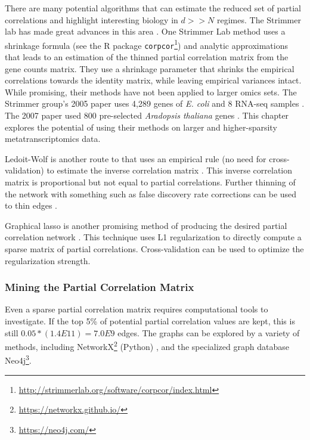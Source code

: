 There are many potential algorithms that can estimate the reduced set of partial correlations and highlight interesting biology in $d >> N$ regimes.
The Strimmer lab has made great advances in this area \cite{schafer2001, schafer2005, opgen2007shrinkage}.
One Strimmer Lab method uses a shrinkage formula (see the R package \texttt{corpcor}\footnote{\url{http://strimmerlab.org/software/corpcor/index.html}}) and analytic approximations that leads to an estimation of the thinned partial correlation matrix from the gene counts matrix.
They use a shrinkage parameter that shrinks the empirical correlations towards the identity matrix, while leaving empirical variances intact.
While promising, their methods have not been applied to larger omics sets.
The Strimmer group's 2005 paper uses 4,289 genes of \textit{E. coli} and 8 RNA-seq samples \cite{schafer2005}.
The 2007 paper used 800 pre-selected \textit{Aradopsis thaliana} genes \cite{opgen2007Aradopsis}.
This chapter explores the potential of using their methods on larger and higher-sparsity metatranscriptomics data.

Ledoit-Wolf is another route to that uses an empirical rule (no need for cross-validation) to estimate the inverse correlation matrix \cite{ledoit2003}.
This inverse correlation matrix is proportional but not equal to partial correlations.
Further thinning of the network with something such as false discovery rate corrections can be used to thin edges \cite{opgen2007Aradopsis}.

Graphical lasso is another promising method of producing the desired partial correlation network \cite{friedman2008}.
This technique uses L1 regularization to directly compute a sparse matrix of partial correlations.
Cross-validation can be used to optimize the regularization strength.

\subsubsection{Mining the Partial Correlation Matrix}
Even a sparse partial correlation matrix requires computational tools to investigate.
If the top 5\% of potential partial correlation values are kept, this is still $0.05*(1.4E11) = 7.0E9$ edges.
The graphs can be explored by a variety of methods, including NetworkX\footnote{\url{https://networkx.github.io/}} (Python) \cite{schult2008}, and the specialized graph database Neo4j\footnote{\url{https://neo4j.com/}}.

